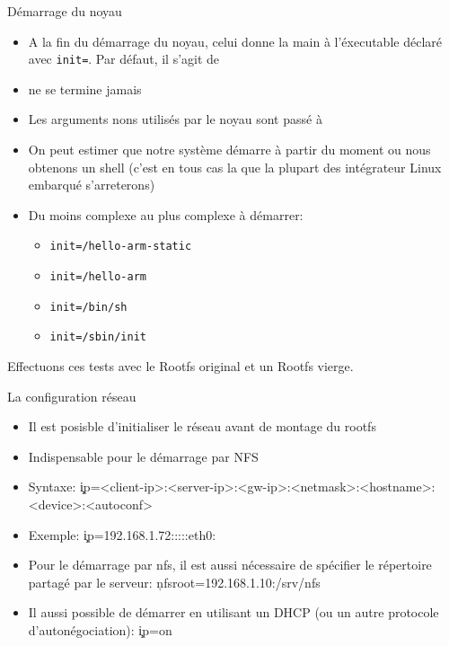 \begin{frame}[fragile=singleslide]{Démarrage du noyau}
  \begin{itemize}
  \item  A  la fin  du  démarrage  du noyau,  celui  donne  la main  à
    l'éxecutable déclaré  avec \verb+init=+. Par défaut,  il s'agit de
  \item {} ne se termine jamais
  \item  Les  arguments  nons  utilisés  par le  noyau  sont  passé  à
  \item On peut  estimer que notre système démarre  à partir du moment
    ou nous  obtenons un shell (c'est  en tous cas  la que la
      plupart des intégrateur Linux embarqué s'arreterons)
  \item Du moins complexe au plus complexe à démarrer:
  \begin{itemize}
    \item \verb+init=/hello-arm-static+
    \item \verb+init=/hello-arm+
    \item \verb+init=/bin/sh+
    \item \verb+init=/sbin/init+
    \end{itemize}
  \end{itemize}
  Effectuons ces tests avec le Rootfs original et un Rootfs vierge.
\end{frame}

\begin{frame}[fragile=singleslide]{La configuration réseau}
  \begin{itemize}
  \item Il est posisble d'initialiser le réseau avant de montage du rootfs
  \item Indispensable pour le démarrage par NFS
  \item Syntaxe: \c{ip=<client-ip>:<server-ip>:<gw-ip>:<netmask>:<hostname>:<device>:<autoconf>} 
  \item Exemple: \c{ip=192.168.1.72:::::eth0:}
  \item  Pour  le  démarrage  par  nfs, il  est  aussi  nécessaire  de
    spécifier    le    répertoire     partagé    par    le    serveur:
    \c{nfsroot=192.168.1.10:/srv/nfs}
  \item  Il aussi possible  de démarrer  en utilisant  un DHCP  (ou un
    autre protocole d'autonégociation): \c{ip=on}
  \end{itemize}
\end{frame} 

